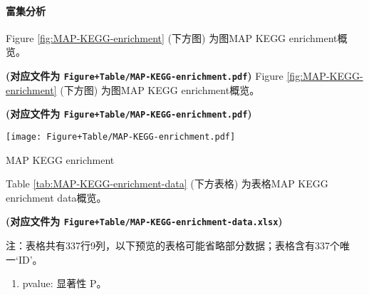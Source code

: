 \documentclass[
]{article}
\providecommand{\tightlist}{%
  \setlength{\itemsep}{0pt}\setlength{\parskip}{0pt}}
\begin{document}
\hypertarget{ux5bccux96c6ux5206ux6790}{%
\paragraph{富集分析}\label{ux5bccux96c6ux5206ux6790}}

Figure \ref{fig:MAP-KEGG-enrichment} (下方图) 为图MAP KEGG enrichment概览。

\textbf{(对应文件为 \texttt{Figure+Table/MAP-KEGG-enrichment.pdf})}
Figure \ref{fig:MAP-KEGG-enrichment} (下方图) 为图MAP KEGG enrichment概览。

\textbf{(对应文件为 \texttt{Figure+Table/MAP-KEGG-enrichment.pdf})}

\def\@captype{figure}
\begin{center}
\texttt{[image: Figure+Table/MAP-KEGG-enrichment.pdf]}
\caption{MAP KEGG enrichment}\label{fig:MAP-KEGG-enrichment}
\end{center}

Table \ref{tab:MAP-KEGG-enrichment-data} (下方表格) 为表格MAP KEGG enrichment data概览。

\textbf{(对应文件为 \texttt{Figure+Table/MAP-KEGG-enrichment-data.xlsx})}

\begin{center}\begin{tcolorbox}[colback=gray!10, colframe=gray!50, width=0.9\linewidth, arc=1mm, boxrule=0.5pt]注：表格共有337行9列，以下预览的表格可能省略部分数据；表格含有337个唯一`ID'。
\end{tcolorbox}
\end{center}
\begin{center}\begin{tcolorbox}[colback=gray!10, colframe=gray!50, width=0.9\linewidth, arc=1mm, boxrule=0.5pt]\begin{enumerate}\tightlist
\item pvalue:  显著性 P。
\end{enumerate}\end{tcolorbox}
\end{center}
\end{document}
